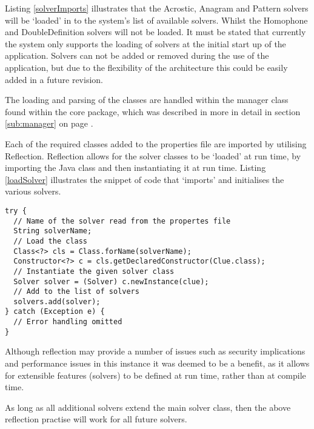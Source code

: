 Listing \ref{solverImports} illustrates that the Acrostic, Anagram and Pattern 
solvers will be `loaded' in to the system's list of available solvers. Whilst 
the Homophone and DoubleDefinition solvers will not be loaded. It must be stated
that currently the system only supports the loading of solvers at the initial 
start up of the application. Solvers can not be added or removed during the use 
of the application, but due to the flexibility of the architecture this could be
easily added in a future revision.

The loading and parsing of the classes are handled within the manager class 
found within the core package, which was described in more in detail in section
\ref{sub:manager} on page \pageref{sub:manager}.

Each of the required classes added to the properties file are imported by 
utilising Reflection. Reflection allows for the solver classes to be `loaded' at
run time, by importing the Java class and then instantiating it at run time. 
Listing \ref{loadSolver} illustrates the snippet of code that `imports' and 
initialises the various solvers.

\begin{lstlisting}[caption={run time class import using reflection}, label=loadSolver]  
try {
  // Name of the solver read from the propertes file
  String solverName;
  // Load the class
  Class<?> cls = Class.forName(solverName);
  Constructor<?> c = cls.getDeclaredConstructor(Clue.class);
  // Instantiate the given solver class
  Solver solver = (Solver) c.newInstance(clue);
  // Add to the list of solvers
  solvers.add(solver);
} catch (Exception e) {
  // Error handling omitted
}
\end{lstlisting}

Although reflection may provide a number of issues such as security implications
and performance issues in this instance it was deemed to be a benefit, as it 
allows for extensible features (solvers) to be defined at run time, rather than
at compile time.

As long as all additional solvers extend the main solver class, then the above 
reflection practise will work for all future solvers.
